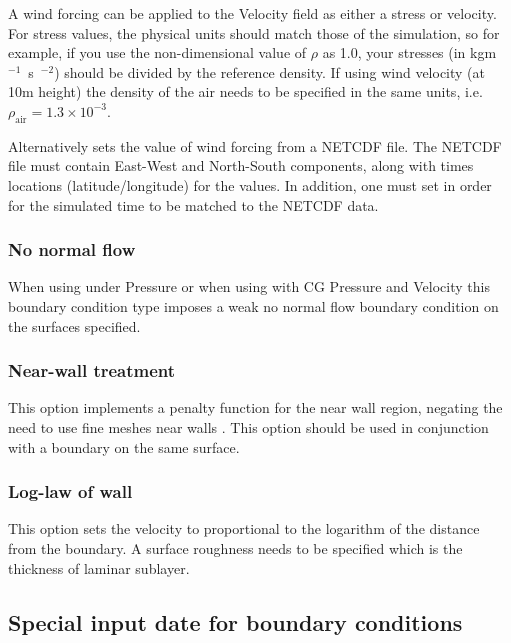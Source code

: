 A wind forcing can be applied to the Velocity field as either a stress or
velocity. For stress values, the physical units should match those of the
simulation, so for example, if you use the non-dimensional value of $\rho$
as 1.0, your stresses (in \unit{kgm\ensuremath{^{-1}}s\ensuremath{^{-2}}})
should be divided by the reference density.  If using wind velocity
(at 10m height) the density of the air needs to be specified in the same
units, i.e. $\rho_{\textrm{air}} = 1.3\times10^{-3}$.

Alternatively
sets the value of wind forcing from a NETCDF file. The NETCDF file must
contain East-West and North-South components, along with times locations
(latitude/longitude) for the values. In addition, one must set
 in order for the simulated
time to be matched to the NETCDF data.

\subsubsection{No normal flow}

When using  under Pressure  or when using 
 with CG Pressure and Velocity this boundary condition type 
imposes a weak no normal flow boundary condition on the surfaces specified.

\subsubsection{Near-wall treatment}

This option implements a penalty function for the near wall region, negating the need to use fine meshes
near walls \citet{bazilevs2007}. This option should be used in conjunction with a 
 boundary on the same surface.

\subsubsection{Log-law of wall}

This option sets the velocity to proportional to the logarithm of the distance from the boundary. 
A surface roughness needs to be specified which is the thickness of laminar sublayer.

\subsection{Special input date for boundary conditions}\label{Sect:BCs:specialised}

